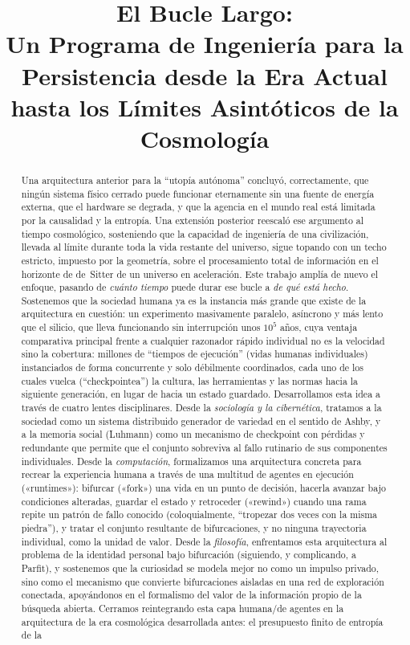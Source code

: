 \documentclass[11pt]{article}
\title{\vspace{-1.5cm}\textbf{El Bucle Largo:}\\[4pt]
\large Un Programa de Ingeniería para la Persistencia desde la Era Actual\\ hasta los Límites Asintóticos de la Cosmología}
\author{}
\date{}
\begin{document}
\maketitle
\thispagestyle{fancy}
\vspace{-1.2cm}

\begin{abstract}
\noindent Una arquitectura anterior para la ``utopía autónoma'' concluyó, correctamente, que ningún sistema físico cerrado puede funcionar eternamente sin una fuente de energía externa, que el hardware se degrada, y que la agencia en el mundo real está limitada por la causalidad y la entropía. Una extensión posterior reescaló ese argumento al tiempo cosmológico, sosteniendo que la capacidad de ingeniería de una civilización, llevada al límite durante toda la vida restante del universo, sigue topando con un techo estricto, impuesto por la geometría, sobre el procesamiento total de información en el horizonte de de~Sitter de un universo en aceleración. Este trabajo amplía de nuevo el enfoque, pasando de \emph{cuánto tiempo} puede durar ese bucle a \emph{de qué está hecho}. Sostenemos que la sociedad humana ya es la instancia más grande que existe de la arquitectura en cuestión: un experimento masivamente paralelo, asíncrono y más lento que el silicio, que lleva funcionando sin interrupción unos $10^5$ años, cuya ventaja comparativa principal frente a cualquier razonador rápido individual no es la velocidad sino la cobertura: millones de ``tiempos de ejecución'' (vidas humanas individuales) instanciados de forma concurrente y solo débilmente coordinados, cada uno de los cuales vuelca (``checkpointea'') la cultura, las herramientas y las normas hacia la siguiente generación, en lugar de hacia un estado guardado. Desarrollamos esta idea a través de cuatro lentes disciplinares. Desde la \emph{sociología y la cibernética}, tratamos a la sociedad como un sistema distribuido generador de variedad en el sentido de Ashby, y a la memoria social (Luhmann) como un mecanismo de checkpoint con pérdidas y redundante que permite que el conjunto sobreviva al fallo rutinario de sus componentes individuales. Desde la \emph{computación}, formalizamos una arquitectura concreta para recrear la experiencia humana a través de una multitud de agentes en ejecución («runtimes»): bifurcar («fork») una vida en un punto de decisión, hacerla avanzar bajo condiciones alteradas, guardar el estado y retroceder («rewind») cuando una rama repite un patrón de fallo conocido (coloquialmente, ``tropezar dos veces con la misma piedra''), y tratar el conjunto resultante de bifurcaciones, y no ninguna trayectoria individual, como la unidad de valor. Desde la \emph{filosofía}, enfrentamos esta arquitectura al problema de la identidad personal bajo bifurcación (siguiendo, y complicando, a Parfit), y sostenemos que la curiosidad se modela mejor no como un impulso privado, sino como el mecanismo que convierte bifurcaciones aisladas en una red de exploración conectada, apoyándonos en el formalismo del valor de la información propio de la búsqueda abierta. Cerramos reintegrando esta capa humana/de agentes en la arquitectura de la era cosmológica desarrollada antes: el presupuesto finito de entropía de la 
\end{abstract}
\end{document}

